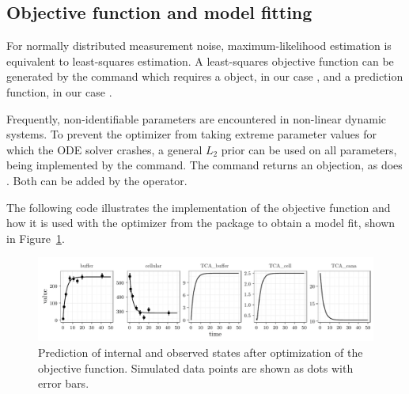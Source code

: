 \documentclass[article]{jss}
\begin{document}
\subsection{Objective function and model fitting}
For normally distributed measurement noise, maximum-likelihood estimation is equivalent to least-squares estimation. A least-squares objective function can be generated by the  command which requires a  object, in our case , and a prediction function, in our case .

Frequently, non-identifiable parameters are encountered in non-linear dynamic systems. To prevent the optimizer from taking extreme parameter values for which the ODE solver crashes, a general $L_2$ prior can be used on all parameters, being implemented by the  command. The command returns an  objection, as does . Both can be added by the  operator.

The following code illustrates the implementation of the objective function and how it is used with the  optimizer from the  package to obtain a model fit, shown in Figure~\ref{fig:myfit}.

\begin{CodeChunk}
\end{CodeChunk}


\begin{figure}[ht]
	\centering
	\includegraphics[width = \textwidth]{images/figure4}
	\caption{Prediction of internal and observed states after optimization of the objective function. Simulated data points are shown as dots with error bars.}
	\label{fig:myfit}
\end{figure}
\end{document}
